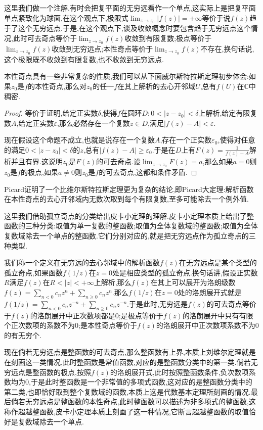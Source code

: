 这里我们做一个注解.有时会把复平面的无穷远看作一个单点,这实际上是把复平面单点紧致化为球面,在这个观点下,极限式$\lim_{z\to z_0}|f(z)|=+\infty$等价于说$f(z)$趋于了这个无穷远点.于是,在这个观点下,谈及收敛概念时要包含趋于无穷远点这个情况,此时可去奇点等价于$\lim_{z\to z_0}f(z)$收敛到有限复数;极点等价于$\lim_{z\to z_0}f(z)$收敛到无穷远点;本性奇点等价于$\lim_{z\to z_0}f(z)$不存在,换句话说,这个极限既不收敛到有限复数,也不收敛到无穷远点.

本性奇点具有一些非常复杂的性质,我们可以从下面威尔斯特拉斯定理初步体会:如果$z_0$是$f$的本性奇点,那么对$z_0$的任一$f$在其上解析的去心开邻域$U$,总有$f(U)$在$\mathbb{C}$中稠密.
\begin{proof}
	
	等价于证明,给定正实数$\delta$,使得$f$在圆环$D:0<|z-z_0|<\delta$上解析,给定有限复数$A$,给定正实数$\varepsilon$,那么必然存在一个复数$z\in D$,满足$|f(z)-A|<\varepsilon$.
	
	现在假设这个命题不成立,也就是说存在一个复数$A$,存在一个正实数$\varepsilon_0$,使得对任意的满足$0<|z-z_0|<\delta$的$z$,总有$|f(z)-A|\ge\varepsilon_0$.于是在$D$上有$F(z)=\frac{1}{f(z)-A}$解析并且有界.这说明$z_0$是$F(z)$的可去奇点.设$\lim_{z\to z_0}F(z)=a$,那么如果$a=0$则$z_0$是$f$的极点,如果$a\not=0$则$z_0$是$f$的可去奇点,这都和条件矛盾.
\end{proof}

Picard证明了一个比维尔斯特拉斯定理更为复杂的结论,即Picard大定理:解析函数在本性奇点的去心开邻域内无数次取到每个有限复数,至多可能除去一个例外值.

这里我们借助孤立奇点的分类给出皮卡小定理的理解.皮卡小定理本质上给出了整函数的三种分类:取值为单一复数的整函数;取值为全体复数域的整函数;取值为全体复数域除去一个单点的整函数.它们分别对应的,就是把无穷远点作为孤立奇点的三种类型.

我们称一个定义在无穷远的去心邻域中的解析函数$f(z)$在无穷远点是某个类型的孤立奇点,如果函数$f(1/z)$在$z=0$处是相应类型的孤立奇点.换句话讲,假设正实数$R$满足$f(z)$在$R<|z|<+\infty$上解析,那么$f(z)$在其上可以展开为洛朗级数$f(z)=\sum_{n<0}c_nz^n+\sum_{n\ge0}c_nz^n$.那么$f(1/z)$在$z=0$处的洛朗展开式就是$f(1/z)=\sum_{n<0}c_nz^{-n}+\sum_{n\ge0}c_nz^{-n}$.于是此时,无穷远是$f(z)$的可去奇点等价于$f(z)$的洛朗展开中正次数项都是0;是极点等价于$f(z)$的洛朗展开中只有有限个正次数项的系数不为0;是本性奇点等价于$f(z)$的洛朗展开中正次数项系数不为0的有无穷个.

现在倘若无穷远点是整函数的可去奇点,那么整函数有上界,本质上刘维尔定理就是在刻画这一类情况,此时整函数是常值函数,对应的是整函数分类中的第一类.倘若无穷远点是整函数的极点,按照$f(z)$的洛朗展开式,此时按照整函数条件,负次数项系数均为0,于是此时整函数是一个非常值的多项式函数,这对应的是整函数分类中的第二类,也即恰好取到整个复数域的函数,本质上这是代数基本定理所刻画的情况.最后倘若无穷远点是整函数的本性奇点,此时整函数可以描述为非多项式的整函数,这称作超越整函数,皮卡小定理本质上刻画了这一种情况,它断言超越整函数的取值恰好是复数域除去一个单点.

